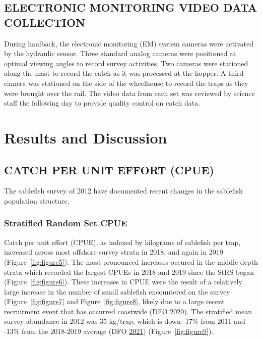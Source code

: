 \documentclass[12pt]{article}\usepackage[]{graphicx}\usepackage[]{color}
\begin{document}
\hypertarget{electronic-monitoring-video-data-collection}{%
\subsection{ELECTRONIC MONITORING VIDEO DATA COLLECTION}\label{electronic-monitoring-video-data-collection}}

During haulback, the electronic monitoring (EM) system cameras were activated by the hydraulic sensor. Three standard analog cameras were positioned at optimal viewing angles to record survey activities. Two cameras were stationed along the mast to record the catch as it was processed at the hopper. A third camera was stationed on the side of the wheelhouse to record the traps as they were brought over the rail. The video data from each set was reviewed by science staff the following day to provide quality control on catch data.

\clearpage

\hypertarget{results-and-discussion}{%
\section{Results and Discussion}\label{results-and-discussion}}

\hypertarget{catch-per-unit-effort-cpue}{%
\subsection{CATCH PER UNIT EFFORT (CPUE)}\label{catch-per-unit-effort-cpue}}

The sablefish survey of 2012 have documented recent changes in the sablefish population structure.

\hypertarget{stratified-random-set-cpue}{%
\subsubsection{Stratified Random Set CPUE}\label{stratified-random-set-cpue}}

Catch per unit effort (CPUE), as indexed by kilograms of sablefish per trap, increased across most offshore survey strata in 2018, and again in 2019 (Figure~\ref{fig:figure5}). The most pronounced increases occured in the middle depth strata which recorded the largest CPUEs in 2018 and 2019 since the StRS began (Figure~\ref{fig:figure6}). These increases in CPUE were the result of a relatively large increase in the number of small sablefish encountered on the survey (Figure~\ref{fig:figure7} and Figure~\ref{fig:figure8}, likely due to a large recent recruitment event that has occurred coastwide (DFO \protect\hyperlink{ref-DFO2020}{2020}). The stratified mean survey abundance in 2012 was 35 kg/trap, which is down -17\% from 2011 and -13\% from the 2018-2019 average (DFO \protect\hyperlink{ref-DFO2021}{2021}) (Figure~\ref{fig:figure9}).
\end{document}
